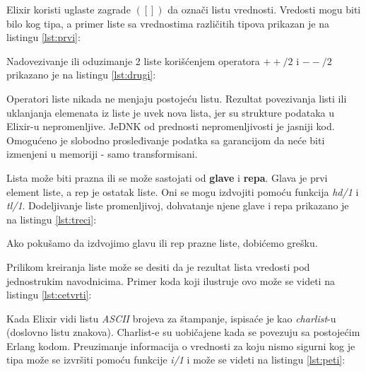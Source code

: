 \documentclass[12pt,oneside]{memoir}
\begin{document}
Elixir koristi uglaste zagrade $([])$ da označi listu vrednosti. Vredosti mogu biti bilo kog tipa, a primer liste sa vrednostima različitih tipova prikazan je na listingu \ref{lst:prvi}:



\newpage

Nadovezivanje ili oduzimanje 2 liste korišćenjem operatora $++/2$ i $--/2$ prikazano je na listingu \ref{lst:drugi}:



Operatori liste nikada ne menjaju postojeću listu. Rezultat povezivanja listi ili uklanjanja elemenata iz liste je uvek nova lista, jer su strukture podataka u Elixir-u nepromenljive. JeDNK od prednosti nepromenljivosti je jasniji kod. Omogućeno je slobodno prosleđivanje podatka sa garancijom da neće biti izmenjeni u memoriji - samo transformisani.

Lista može biti prazna ili se može sastojati od \textbf{glave} i \textbf{repa}. Glava je prvi element liste, a rep je ostatak liste. Oni se mogu izdvojiti pomoću funkcija \textit{hd/1} i \textit{tl/1}. Dodeljivanje liste promenljivoj, dohvatanje njene glave i repa prikazano je na listingu \ref{lst:treci}:



Ako pokušamo da izdvojimo glavu ili rep prazne liste, dobićemo grešku.

Prilikom kreiranja liste može se desiti da je rezultat lista vredosti pod jednostrukim navodnicima. Primer koda koji ilustruje ovo može se videti na listingu \ref{lst:cetvrti}:



Kada Elixir vidi listu \textit{ASCII} brojeva za štampanje, ispisaće je kao \textit{charlist}-u (doslovno listu znakova). Charlist-e su uobičajene kada se povezuju sa postojećim Erlang kodom. Preuzimanje informacija o vrednosti za koju nismo sigurni kog je tipa može se izvršiti pomoću funkcije \textit{i/1} i može se videti na listingu \ref{lst:peti}:


\end{document}

